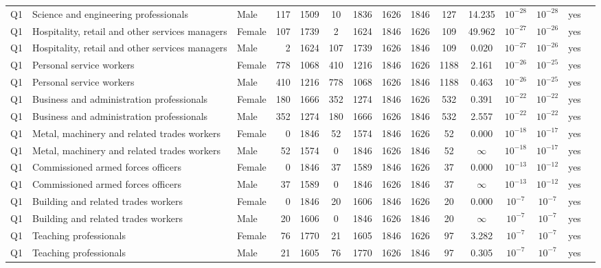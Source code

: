 \begin{longtable}{lllrcccccccccll}
Q1 & Science and engineering professionals & Male & 117 & 1509 & 10 & 1836 & 1626 & 1846 & 127 & 14.235 & $10^{-28}$ & $10^{-28}$ & yes \\
Q1 & Hospitality, retail and other services managers & Female & 107 & 1739 & 2 & 1624 & 1846 & 1626 & 109 & 49.962 & $10^{-27}$ & $10^{-26}$ & yes \\
Q1 & Hospitality, retail and other services managers & Male & 2 & 1624 & 107 & 1739 & 1626 & 1846 & 109 & 0.020 & $10^{-27}$ & $10^{-26}$ & yes \\
Q1 & Personal service workers & Female & 778 & 1068 & 410 & 1216 & 1846 & 1626 & 1188 & 2.161 & $10^{-26}$ & $10^{-25}$ & yes \\
Q1 & Personal service workers & Male & 410 & 1216 & 778 & 1068 & 1626 & 1846 & 1188 & 0.463 & $10^{-26}$ & $10^{-25}$ & yes \\
Q1 & Business and administration professionals & Female & 180 & 1666 & 352 & 1274 & 1846 & 1626 & 532 & 0.391 & $10^{-22}$ & $10^{-22}$ & yes \\
Q1 & Business and administration professionals & Male & 352 & 1274 & 180 & 1666 & 1626 & 1846 & 532 & 2.557 & $10^{-22}$ & $10^{-22}$ & yes \\
Q1 & Metal, machinery and related trades workers & Female & 0 & 1846 & 52 & 1574 & 1846 & 1626 & 52 & 0.000 & $10^{-18}$ & $10^{-17}$ & yes \\
Q1 & Metal, machinery and related trades workers & Male & 52 & 1574 & 0 & 1846 & 1626 & 1846 & 52 & $\infty$ & $10^{-18}$ & $10^{-17}$ & yes \\
Q1 & Commissioned armed forces officers & Female & 0 & 1846 & 37 & 1589 & 1846 & 1626 & 37 & 0.000 & $10^{-13}$ & $10^{-12}$ & yes \\
Q1 & Commissioned armed forces officers & Male & 37 & 1589 & 0 & 1846 & 1626 & 1846 & 37 & $\infty$ & $10^{-13}$ & $10^{-12}$ & yes \\
Q1 & Building and related trades workers & Female & 0 & 1846 & 20 & 1606 & 1846 & 1626 & 20 & 0.000 & $10^{-7}$ & $10^{-7}$ & yes \\
Q1 & Building and related trades workers & Male & 20 & 1606 & 0 & 1846 & 1626 & 1846 & 20 & $\infty$ & $10^{-7}$ & $10^{-7}$ & yes \\
Q1 & Teaching professionals & Female & 76 & 1770 & 21 & 1605 & 1846 & 1626 & 97 & 3.282 & $10^{-7}$ & $10^{-7}$ & yes \\
Q1 & Teaching professionals & Male & 21 & 1605 & 76 & 1770 & 1626 & 1846 & 97 & 0.305 & $10^{-7}$ & $10^{-7}$ & yes \\

\end{longtable}
